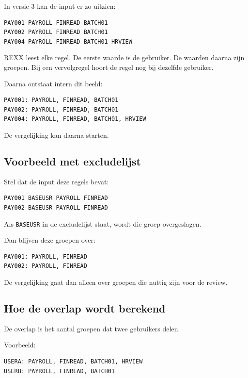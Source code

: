 In versie 3 kan de input er zo uitzien:

\begin{verbatim}
PAY001 PAYROLL FINREAD BATCH01
PAY002 PAYROLL FINREAD BATCH01
PAY004 PAYROLL FINREAD BATCH01 HRVIEW
\end{verbatim}

REXX leest elke regel. De eerste waarde is de gebruiker. De waarden daarna zijn groepen. Bij een vervolgregel hoort de regel nog bij dezelfde gebruiker.

Daarna ontstaat intern dit beeld:

\begin{verbatim}
PAY001: PAYROLL, FINREAD, BATCH01
PAY002: PAYROLL, FINREAD, BATCH01
PAY004: PAYROLL, FINREAD, BATCH01, HRVIEW
\end{verbatim}

De vergelijking kan daarna starten.

\subsection*{Voorbeeld met excludelijst}

Stel dat de input deze regels bevat:

\begin{verbatim}
PAY001 BASEUSR PAYROLL FINREAD
PAY002 BASEUSR PAYROLL FINREAD
\end{verbatim}

Als \texttt{BASEUSR} in de excludelijst staat, wordt die groep overgeslagen.

Dan blijven deze groepen over:

\begin{verbatim}
PAY001: PAYROLL, FINREAD
PAY002: PAYROLL, FINREAD
\end{verbatim}

De vergelijking gaat dan alleen over groepen die nuttig zijn voor de review.

\subsection*{Hoe de overlap wordt berekend}

De overlap is het aantal groepen dat twee gebruikers delen.

Voorbeeld:

\begin{verbatim}
USERA: PAYROLL, FINREAD, BATCH01, HRVIEW
USERB: PAYROLL, FINREAD, BATCH01
\end{verbatim}


